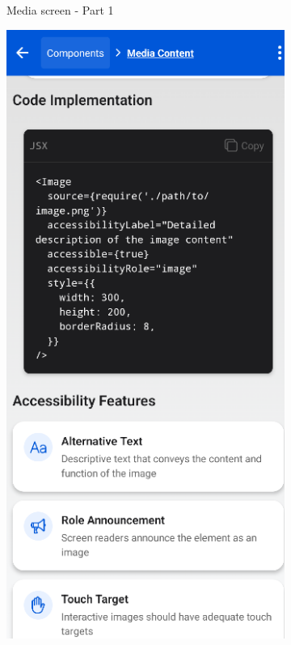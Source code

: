 \begin{enumerate}
\begin{itemize}
\begin{figure}[ht]
\begin{subfigure}[b]{0.48\textwidth}
                \caption{Media screen - Part 1}
                \label{fig:media-left}
            \end{subfigure}
            \hfill
            \begin{subfigure}[b]{0.48\textwidth}
                \centering
                \includegraphics[width=\linewidth, alt={Second part of the Media screen}]{img/media2.png}

\end{subfigure}
\end{figure}
\end{itemize}
\end{enumerate}
